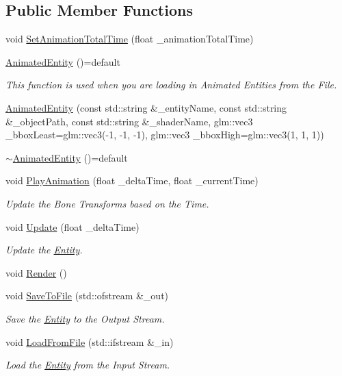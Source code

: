 \subsection*{Public Member Functions}
\begin{DoxyCompactItemize}
\item 
void \mbox{\hyperlink{classpiolot_1_1_animated_entity_ada8db1e8e54e8fc3bef18529ca63b68b}{Set\+Animation\+Total\+Time}} (float \+\_\+animation\+Total\+Time)
\item 
\mbox{\hyperlink{classpiolot_1_1_animated_entity_a683b381fca2c7d94196fbf44bbc9911b}{Animated\+Entity}} ()=default
\begin{DoxyCompactList}\small\item\em This function is used when you are loading in Animated Entities from the File. \end{DoxyCompactList}\item 
\mbox{\hyperlink{classpiolot_1_1_animated_entity_ac94067c874bde16328f24b613e67e516}{Animated\+Entity}} (const std\+::string \&\+\_\+entity\+Name, const std\+::string \&\+\_\+object\+Path, const std\+::string \&\+\_\+shader\+Name, glm\+::vec3 \+\_\+bbox\+Least=glm\+::vec3(-\/1, -\/1, -\/1), glm\+::vec3 \+\_\+bbox\+High=glm\+::vec3(1, 1, 1))
\item 
\mbox{\hyperlink{classpiolot_1_1_animated_entity_a49a3fe0f59734e48cb70804fc3c5ef9c}{$\sim$\+Animated\+Entity}} ()=default
\item 
void \mbox{\hyperlink{classpiolot_1_1_animated_entity_ac136308002d8df68468bf489aa1a584c}{Play\+Animation}} (float \+\_\+delta\+Time, float \+\_\+current\+Time)
\begin{DoxyCompactList}\small\item\em Update the Bone Transforms based on the Time. \end{DoxyCompactList}\item 
void \mbox{\hyperlink{classpiolot_1_1_animated_entity_ad616db0c5f74205e41257a5c3d71a16b}{Update}} (float \+\_\+delta\+Time)
\begin{DoxyCompactList}\small\item\em Update the \mbox{\hyperlink{classpiolot_1_1_entity}{Entity}}. \end{DoxyCompactList}\item 
void \mbox{\hyperlink{classpiolot_1_1_animated_entity_a087000fec2d12db05ca9e07676318ed2}{Render}} ()
\item 
void \mbox{\hyperlink{classpiolot_1_1_animated_entity_af3d37876b5baa074f3298a3448191a67}{Save\+To\+File}} (std\+::ofstream \&\+\_\+out)
\begin{DoxyCompactList}\small\item\em Save the \mbox{\hyperlink{classpiolot_1_1_entity}{Entity}} to the Output Stream. \end{DoxyCompactList}\item 
void \mbox{\hyperlink{classpiolot_1_1_animated_entity_a618a360c064a9abe9589ab1d7fbb9882}{Load\+From\+File}} (std\+::ifstream \&\+\_\+in)
\begin{DoxyCompactList}\small\item\em Load the \mbox{\hyperlink{classpiolot_1_1_entity}{Entity}} from the Input Stream. \end{DoxyCompactList}\end{DoxyCompactItemize}
